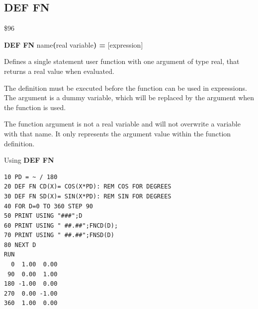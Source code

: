
\newpage
\subsection{DEF FN}
\begin{description}[leftmargin=2cm,style=nextline]
\item [Token:] \$96
\item [Format:] {\bf DEF FN} name{\bf(}real variable{\bf) =} [expression]
\item [Usage:] Defines a single statement
               user function with one argument of type real,
               that returns a real value when evaluated.

               The definition must be executed before the function
               can be used in expressions. The argument is
               a dummy variable, which will be replaced by the
               argument when the function is used.

\item [Remarks:] The function argument is not a real variable and will
               not overwrite a variable with that name. It only represents
               the argument value within the function definition.

\item [Example:] Using {\bf DEF FN}
\begin{tcolorbox}[colback=black,coltext=white]
\verbatimfont{\codefont}
\begin{verbatim}
10 PD = ~ / 180
20 DEF FN CD(X)= COS(X*PD): REM COS FOR DEGREES
30 DEF FN SD(X)= SIN(X*PD): REM SIN FOR DEGREES
40 FOR D=0 TO 360 STEP 90
50 PRINT USING "###";D
60 PRINT USING " ##.##";FNCD(D);
70 PRINT USING " ##.##";FNSD(D)
80 NEXT D
RUN
  0  1.00  0.00
 90  0.00  1.00
180 -1.00  0.00
270  0.00 -1.00
360  1.00  0.00
\end{verbatim}
\end{tcolorbox}
\end{description}


\newpage
